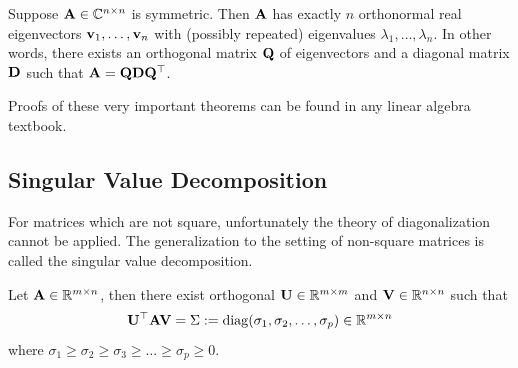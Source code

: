 \begin{theorem}\label{thm-spec}
Suppose $\MA \in \C^{n \times n}$ is symmetric. Then $\MA$ has exactly $n$ orthonormal real eigenvectors $\vv_1, \ldots, \vv_n$ with (possibly repeated) eigenvalues $\lambda_1, \ldots, \lambda_n$. In other words, there exists an orthogonal matrix $\MQ$ of eigenvectors and a diagonal matrix $\MD$ such that 
$\MA = \MQ\MD\MQ^\top$.
\end{theorem}

Proofs of these very important theorems can be found in any linear algebra textbook.

\subsection{Singular Value Decomposition}

For matrices which are not square, unfortunately the theory of diagonalization cannot be applied. The generalization to the setting of non-square matrices is called the singular value decomposition.

\begin{theorem}
Let $\MA \in \R^{m \times n}$, then there exist orthogonal $\MU \in \R^{m \times m}$ and $\MV \in \R^{n \times n}$ such that 
$$\MU^\top \MA \MV = \bSigma := \diag(\sigma_1, \sigma_2, \ldots, \sigma_p) \in \mathbb R^{m \times n}$$
where $\sigma_1 \geq \sigma_2 \geq \sigma_3 \geq \ldots \geq \sigma_p \geq 0.$
\end{theorem}

